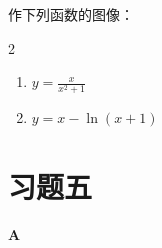 \begin{ex}
作下列函数的图像：
\begin{multicols}{2}
\begin{enumerate}
    \item $y=\frac{x}{x^2+1}$
    \item $y=x-\ln(x+1)$
\end{enumerate}
\end{multicols}
\end{ex}



\section*{习题五}
\begin{center}
    \bfseries A
\end{center}

